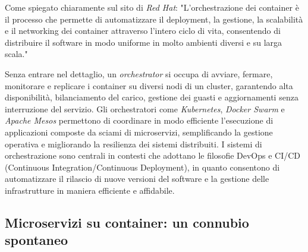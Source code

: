 Come spiegato chiaramente sul sito di \emph{Red Hat}: "L'orchestrazione dei container è il processo che permette di automatizzare il deployment, la gestione, la scalabilità e il networking dei container attraverso l'intero ciclo di vita, consentendo di distribuire il software in modo uniforme in molto ambienti diversi e su larga scala." \cite{RedHat_Orchestration}

Senza entrare nel dettaglio, un \emph{orchestrator} si occupa di avviare, fermare, monitorare e replicare i container su diversi nodi di un cluster, garantendo alta disponibilità, bilanciamento del carico, gestione dei guasti e aggiornamenti senza interruzione del servizio. Gli orchestratori come \emph{Kubernetes}, \emph{Docker Swarm} e \emph{Apache Mesos} permettono di coordinare in modo efficiente l'esecuzione di applicazioni composte da sciami di microservizi, semplificando la gestione operativa e migliorando la resilienza dei sistemi distribuiti.
I sistemi di orchestrazione sono centrali in contesti che adottano le filosofie DevOps e CI/CD (Continuous Integration/Continuous Deployment), in quanto consentono di automatizzare il rilascio di nuove versioni del software e la gestione delle infrastrutture in maniera efficiente e affidabile.

\subsection{Microservizi su container: un connubio spontaneo}





